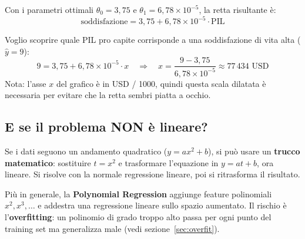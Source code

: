 Con i parametri ottimali $\theta_0 = 3{,}75$ e $\theta_1 = 6{,}78 \times 10^{-5}$, la retta risultante è:
\[
\text{soddisfazione} = 3{,}75 + 6{,}78 \times 10^{-5} \cdot \text{PIL}
\]

\begin{exbox}
Voglio scoprire quale PIL pro capite corrisponde a una soddisfazione di vita alta ($\hat{y} = 9$):
\[
9 = 3{,}75 + 6{,}78 \times 10^{-5} \cdot x
\quad\Rightarrow\quad
x = \frac{9 - 3{,}75}{6{,}78 \times 10^{-5}} \approx 77\,434 \text{ USD}
\]
Nota: l'asse $x$ del grafico è in USD / 1000, quindi questa scala dilatata è necessaria per evitare che la retta sembri piatta a occhio.
\end{exbox}

\subsection{E se il problema NON è lineare?}

Se i dati seguono un andamento quadratico ($y = ax^2 + b$), si può usare un \textbf{trucco matematico}: sostituire $t = x^2$ e trasformare l'equazione in $y = at + b$, ora lineare. Si risolve con la normale regressione lineare, poi si ritrasforma il risultato.

\begin{center}
\end{center}

Più in generale, la \textbf{Polynomial Regression} aggiunge feature polinomiali $x^2, x^3, \ldots$ e addestra una regressione lineare sullo spazio aumentato. Il rischio è l'\textbf{overfitting}: un polinomio di grado troppo alto passa per ogni punto del training set ma generalizza male (vedi sezione~\ref{sec:overfit}).

